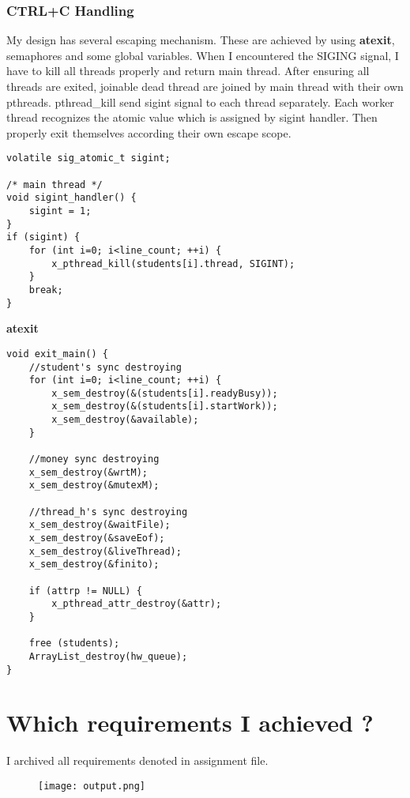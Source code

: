 \documentclass{article}
\begin{document}
\subsubsection{CTRL+C Handling}
My design has several escaping mechanism. These are achieved by using \textbf{atexit}, semaphores and some global variables. When I encountered the SIGING signal, I have to kill all threads properly and return main thread. After ensuring all threads are exited, joinable dead thread are joined by main thread with their own pthreads. pthread\_kill send sigint signal to each thread separately. Each worker thread recognizes the atomic value which is assigned by sigint handler. Then properly exit themselves according their own escape scope. 
\begin{lstlisting}[style=CStyle]
volatile sig_atomic_t sigint;

/* main thread */
void sigint_handler() {
    sigint = 1;
}
if (sigint) {
    for (int i=0; i<line_count; ++i) {
        x_pthread_kill(students[i].thread, SIGINT);
    }
    break;
}
\end{lstlisting}
\newpage
\textbf{atexit}\
\begin{lstlisting}[style=CStyle]
void exit_main() {
    //student's sync destroying
    for (int i=0; i<line_count; ++i) {
        x_sem_destroy(&(students[i].readyBusy));
        x_sem_destroy(&(students[i].startWork));
        x_sem_destroy(&available);
    }

    //money sync destroying
    x_sem_destroy(&wrtM);
    x_sem_destroy(&mutexM);

    //thread_h's sync destroying
    x_sem_destroy(&waitFile);
    x_sem_destroy(&saveEof);
    x_sem_destroy(&liveThread);
    x_sem_destroy(&finito);

    if (attrp != NULL) {
        x_pthread_attr_destroy(&attr);
    }

    free (students);
    ArrayList_destroy(hw_queue);
}
\end{lstlisting}
\section{Which requirements I achieved ?}
I archived all requirements denoted in assignment file.
\begin{figure}[H]
\texttt{[image: output.png]}
\caption[Optional caption]{}
\label{}
\end{figure}                    
\end{document}
